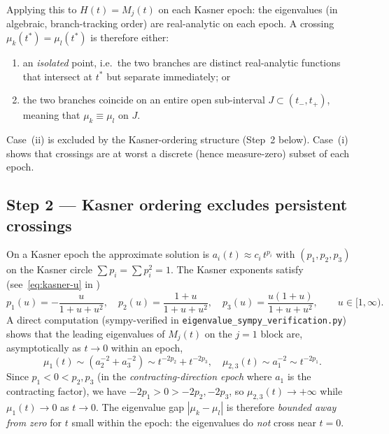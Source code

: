 \documentclass[11pt]{article}
\theoremstyle{definition}
\begin{document}
Applying this to $H(t) = M_j(t)$ on each Kasner epoch: the eigenvalues
(in algebraic, branch-tracking order) are real-analytic on each epoch.
A crossing $\mu_k(t^*) = \mu_l(t^*)$ is therefore either:
\begin{enumerate}
  \item[(i)] an \emph{isolated} point, i.e.\ the two branches are distinct
    real-analytic functions that intersect at $t^*$ but separate immediately; or
  \item[(ii)] the two branches coincide on an entire open sub-interval
    $J \subset (t_-,t_+)$, meaning that $\mu_k \equiv \mu_l$ on $J$.
\end{enumerate}
Case~(ii) is excluded by the Kasner-ordering structure (Step~2 below).
Case~(i) shows that crossings are at worst a discrete (hence measure-zero) subset
of each epoch.

\subsection{Step 2 --- Kasner ordering excludes persistent crossings}

On a Kasner epoch the approximate solution is $a_i(t) \approx c_i\, t^{p_i}$
with $(p_1,p_2,p_3)$ on the Kasner circle $\sum p_i = \sum p_i^2 = 1$.
The Kasner exponents satisfy (see~\eqref{eq:kasner-u} in \cite{note_AWCH_BIX})
\[
  p_1(u) = -\frac{u}{1+u+u^2},\quad
  p_2(u) = \frac{1+u}{1+u+u^2},\quad
  p_3(u) = \frac{u(1+u)}{1+u+u^2},
  \qquad u \in [1,\infty).
\]
A direct computation (sympy-verified in \texttt{eigenvalue\_sympy\_verification.py})
shows that the leading eigenvalues of $M_j(t)$ on the $j=1$ block are, asymptotically
as $t\to 0$ within an epoch,
\[
  \mu_1(t) \sim (a_2^{-2}+a_3^{-2}) \sim t^{-2p_2} + t^{-2p_3},\quad
  \mu_{2,3}(t) \sim a_1^{-2} \sim t^{-2p_1}.
\]
Since $p_1 < 0 < p_2, p_3$ (in the \emph{contracting-direction epoch} where $a_1$
is the contracting factor), we have $-2p_1 > 0 > -2p_2, -2p_3$, so
$\mu_{2,3}(t) \to +\infty$ while $\mu_1(t) \to 0$ as $t\to 0$.
The eigenvalue gap $|\mu_k - \mu_l|$ is therefore \emph{bounded away from zero}
for $t$ small within the epoch: the eigenvalues do \emph{not} cross near $t=0$.
\end{document}
